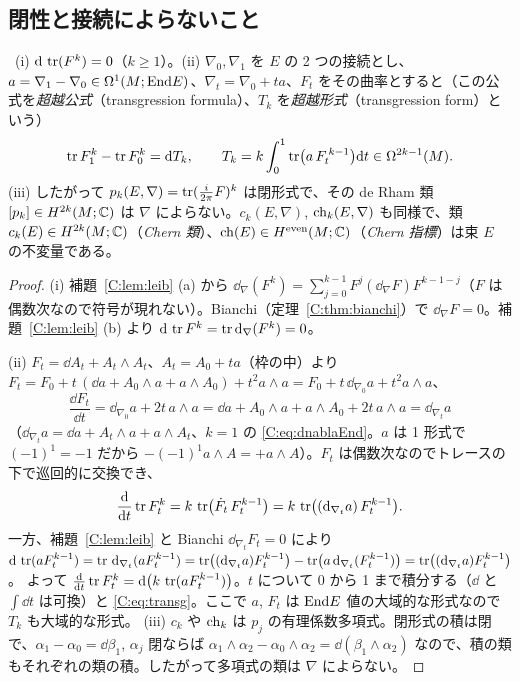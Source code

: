 \subsection{閉性と接続によらないこと}
\begin{thm}\label{C:thm:CW}\tP\
(i) $\mathrm{d}\,\operatorname{tr}(F^k)=0$（$k\ge1$）。(ii) $\nabla_0,\nabla_1$ を $E$ の 2 つの接続とし、$a=\nabla_1-\nabla_0\in\Omega^1(M;\mathrm{End} E)$、$\nabla_t=\nabla_0+ta$、$F_t$ をその曲率とすると（この公式を\emph{超越公式}（transgression formula）、$T_k$ を\emph{超越形式}（transgression form）という）
\begin{equation}\label{C:eq:transg}
\operatorname{tr} F_1^k-\operatorname{tr} F_0^k=\mathrm{d} T_k,\qquad T_k=k\int_0^1\operatorname{tr}\bigl(a\,F_t^{\,k-1}\bigr)\mathrm{d} t\in\Omega^{2k-1}(M).
\end{equation}
(iii) したがって $p_k(E,\nabla)=\operatorname{tr}(\frac i{2\pi}F)^k$ は閉形式で、その de Rham 類 $[p_k]\in H^{2k}(M;\mathbb C)$ は $\nabla$ によらない。$c_k(E,\nabla)$, $\mathrm{ch}_k(E,\nabla)$ も同様で、類 $c_k(E)\in H^{2k}(M;\mathbb C)$（\emph{Chern 類}）、$\mathrm{ch}(E)\in H^{\mathrm{even}}(M;\mathbb C)$（\emph{Chern 指標}）は束 $E$ の不変量である。
\end{thm}
\begin{proof}
(i) 補題~\ref{C:lem:leib} (a) から $\dd_\nabla(F^k)=\sum_{j=0}^{k-1}F^j(\dd_\nabla F)F^{k-1-j}$（$F$ は偶数次なので符号が現れない）。Bianchi（定理~\ref{C:thm:bianchi}）で $\dd_\nabla F=0$。補題~\ref{C:lem:leib} (b) より $\mathrm{d}\,\operatorname{tr} F^k=\operatorname{tr}\mathrm{d}_\nabla(F^k)=0$。

(ii) $F_t=\dd A_t+A_t\wedge A_t$、$A_t=A_0+ta$（枠の中）より $F_t=F_0+t\,(\dd a+A_0\wedge a+a\wedge A_0)+t^2a\wedge a=F_0+t\,\dd_{\nabla_0}a+t^2a\wedge a$、
\[
\frac{\dd F_t}{\dd t}=\dd_{\nabla_0}a+2t\,a\wedge a=\dd a+A_0\wedge a+a\wedge A_0+2t\,a\wedge a=\dd_{\nabla_t}a
\]
（$\dd_{\nabla_t}a=\dd a+A_t\wedge a+a\wedge A_t$、$k=1$ の \eqref{C:eq:dnablaEnd}。$a$ は 1 形式で $(-1)^1=-1$ だから $-(-1)^1a\wedge A=+a\wedge A$）。$F_t$ は偶数次なのでトレースの下で巡回的に交換でき、
\[
\frac{\mathrm{d}}{\mathrm{d} t}\operatorname{tr} F_t^k=k\,\operatorname{tr}\bigl(\dot F_t\,F_t^{k-1}\bigr)=k\,\operatorname{tr}\bigl((\mathrm{d}_{\nabla_t}a)\,F_t^{k-1}\bigr).
\]
一方、補題~\ref{C:lem:leib} と Bianchi $\dd_{\nabla_t}F_t=0$ により
$\mathrm{d}\,\operatorname{tr}(aF_t^{k-1})=\operatorname{tr}\,\mathrm{d}_{\nabla_t}(aF_t^{k-1})=\operatorname{tr}\bigl((\mathrm{d}_{\nabla_t}a)F_t^{k-1}\bigr)-\operatorname{tr}\bigl(a\,\mathrm{d}_{\nabla_t}(F_t^{k-1})\bigr)=\operatorname{tr}\bigl((\mathrm{d}_{\nabla_t}a)F_t^{k-1}\bigr)$。
よって $\frac{\mathrm{d}}{\mathrm{d} t}\operatorname{tr} F_t^k=\mathrm{d}\bigl(k\,\operatorname{tr}(aF_t^{k-1})\bigr)$。$t$ について 0 から 1 まで積分する（$\dd$ と $\int\dd t$ は可換）と \eqref{C:eq:transg}。ここで $a$, $F_t$ は $\mathrm{End} E$ 値の大域的な形式なので $T_k$ も大域的な形式。
(iii) $c_k$ や $\mathrm{ch}_k$ は $p_j$ の有理係数多項式。閉形式の積は閉で、$\alpha_1-\alpha_0=\dd\beta_1$, $\alpha_j$ 閉ならば $\alpha_1\wedge\alpha_2-\alpha_0\wedge\alpha_2=\dd(\beta_1\wedge\alpha_2)$ なので、積の類もそれぞれの類の積。したがって多項式の類は $\nabla$ によらない。
\end{proof}

